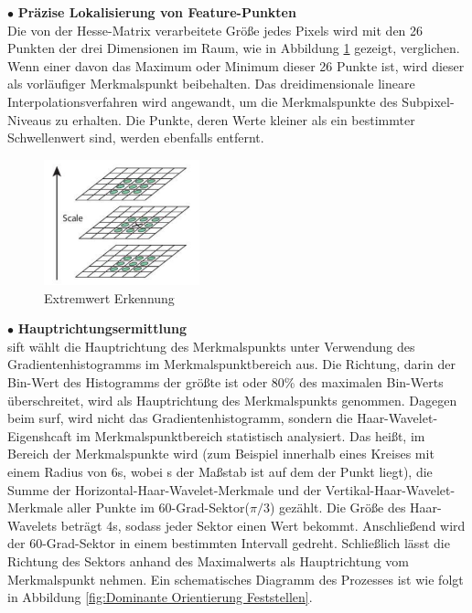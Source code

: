 $\bullet$ \textbf{Präzise Lokalisierung von Feature-Punkten}\\
Die von der Hesse-Matrix verarbeitete Größe jedes Pixels wird mit den 26 Punkten der drei Dimensionen im Raum, wie in Abbildung \ref{fig:Extremwert Erkennung} gezeigt, verglichen. Wenn einer davon das Maximum oder Minimum dieser 26 Punkte ist, wird dieser als vorläufiger Merkmalspunkt beibehalten. Das dreidimensionale lineare Interpolationsverfahren wird angewandt, um die Merkmalspunkte des Subpixel-Niveaus zu erhalten. Die Punkte, deren Werte kleiner als ein bestimmter Schwellenwert sind, werden ebenfalls entfernt.

\begin{figure}[htb]
 \centering 
 \includegraphics[keepaspectratio,width=0.4\textwidth]{images/3_Ersteverfahren/Extreme_Wert_Erkennung.pdf}
 \caption{Extremwert Erkennung}
 \label{fig:Extremwert Erkennung}
\end{figure} 


$\bullet$ \textbf{Hauptrichtungsermittlung}\\
\gls{sift} wählt die Hauptrichtung des Merkmalspunkts unter Verwendung des Gradientenhistogramms im Merkmalspunktbereich aus. Die Richtung, darin der Bin-Wert des Histogramms der größte ist oder 80\% des maximalen Bin-Werts überschreitet, wird als Hauptrichtung des Merkmalspunkts genommen. Dagegen beim \gls{surf}, wird nicht das Gradientenhistogramm, sondern die Haar-Wavelet-Eigenshcaft im Merkmalspunktbereich statistisch analysiert. Das heißt, im Bereich der Merkmalspunkte wird (zum Beispiel innerhalb eines Kreises mit einem Radius von 6\si{s}, wobei s der Maßstab ist auf dem der Punkt liegt), die Summe der Horizontal-Haar-Wavelet-Merkmale und der Vertikal-Haar-Wavelet-Merkmale aller Punkte im  60-Grad-Sektor($\pi/3$) gezählt. Die Größe des Haar-Wavelets beträgt 4\si{s}, sodass jeder Sektor einen Wert bekommt. Anschließend wird der 60-Grad-Sektor in einem bestimmten Intervall gedreht. Schließlich lässt die Richtung des Sektors anhand des Maximalwerts als Hauptrichtung vom Merkmalspunkt nehmen. Ein schematisches Diagramm des Prozesses ist wie folgt in Abbildung \ref{fig:Dominante Orientierung Feststellen}.

